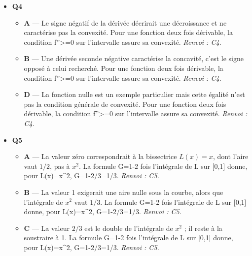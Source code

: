 \begin{itemize}
\begin{itemize}
    \item \textbf{D} — Dans le modèle de Lorenz, la courbe reste sous la première bissectrice ; l'égalité la confond avec celle-ci. Un indice de Gini proche de 0 décrit une répartition presque égalitaire ; plus il augmente, plus l'inégalité est forte. \emph{Renvoi : C3.}
  \end{itemize}
  \item \textbf{Q4}
  \begin{itemize}
    \item \textbf{A} — Le signe négatif de la dérivée décrirait une décroissance et ne caractérise pas la convexité. Pour une fonction deux fois dérivable, la condition f''>=0 sur l'intervalle assure sa convexité. \emph{Renvoi : C4.}
    \item \textbf{B} — Une dérivée seconde négative caractérise la concavité, c'est le signe opposé à celui recherché. Pour une fonction deux fois dérivable, la condition f''>=0 sur l'intervalle assure sa convexité. \emph{Renvoi : C4.}
    \item \textbf{D} — La fonction nulle est un exemple particulier mais cette égalité n'est pas la condition générale de convexité. Pour une fonction deux fois dérivable, la condition f''>=0 sur l'intervalle assure sa convexité. \emph{Renvoi : C4.}
  \end{itemize}
  \item \textbf{Q5}
  \begin{itemize}
    \item \textbf{A} — La valeur zéro correspondrait à la bissectrice $L(x)=x$, dont l'aire vaut $1/2$, pas à $x^2$. La formule G=1-2 fois l'intégrale de L sur [0,1] donne, pour L(x)=x\textasciicircum{}2, G=1-2/3=1/3. \emph{Renvoi : C5.}
    \item \textbf{B} — La valeur 1 exigerait une aire nulle sous la courbe, alors que l'intégrale de $x^2$ vaut $1/3$. La formule G=1-2 fois l'intégrale de L sur [0,1] donne, pour L(x)=x\textasciicircum{}2, G=1-2/3=1/3. \emph{Renvoi : C5.}
    \item \textbf{C} — La valeur $2/3$ est le double de l'intégrale de $x^2$ ; il reste à la soustraire à 1. La formule G=1-2 fois l'intégrale de L sur [0,1] donne, pour L(x)=x\textasciicircum{}2, G=1-2/3=1/3. \emph{Renvoi : C5.}
  \end{itemize}
\end{itemize}
\fi
